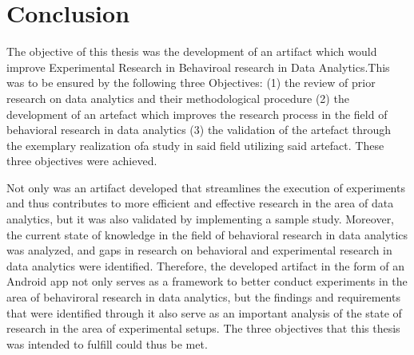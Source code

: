 \section{Conclusion}


The objective of this thesis was the development of an artifact which would improve Experimental Research in Behaviroal research in Data Analytics.This was to be ensured by the following three Objectives: (1) the review of prior research on data analytics and their methodological procedure (2) the development of an artefact which improves the research process in the field of behavioral research in data analytics (3) the validation of the artefact through the exemplary realization ofa study in said field utilizing said artefact. These three objectives were achieved.



Not only was an artifact developed that streamlines the execution of experiments and thus contributes to more efficient and effective research in the area of data analytics, but 
it was also validated by implementing a sample study. Moreover, the current state of knowledge in the field of behavioral research in data analytics was analyzed, and gaps in research on behavioral and experimental research in data analytics were identified. Therefore, the developed artifact in the form of an Android app not only serves as a framework to better conduct experiments in the area of behaviroral research in data analytics, but the findings and requirements that were identified through it also serve as an important analysis of the state of research in the area of experimental setups. The three objectives that this thesis was intended to fulfill could thus be met.

